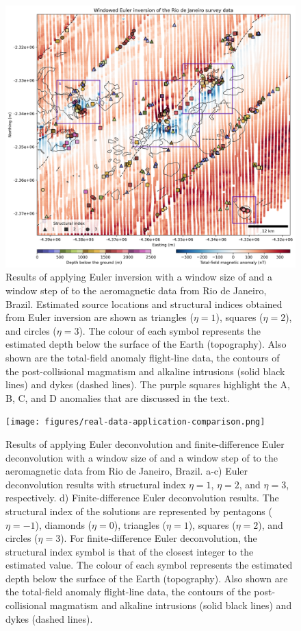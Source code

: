 \begin{figure}[tb!]
\centering
\includegraphics[width=1\linewidth]{figures/real-data-application.png}
\caption{
    Results of applying Euler inversion with a window size of \RioWindowSize{}
    and a window step of \RioWindowStep{} to the aeromagnetic data from Rio de
    Janeiro, Brazil.
    Estimated source locations and structural indices obtained from Euler
    inversion are shown as triangles ($\eta=1$), squares ($\eta=2$), and
    circles ($\eta=3$).
    The colour of each symbol represents the estimated depth below the surface
    of the Earth (topography).
    Also shown are the total-field anomaly flight-line data, the contours of
    the post-collisional magmatism and alkaline intrusions (solid black lines)
    and dykes (dashed lines).
    The purple squares highlight the A, B, C, and D anomalies that are
    discussed in the text.
}
\label{fig:rio_results}
\end{figure}

\begin{figure}[tb!]
\centering
\texttt{[image: figures/real-data-application-comparison.png]}
\caption{
    Results of applying Euler deconvolution and finite-difference Euler
    deconvolution with a window size of \RioWindowSize{} and a window step of
    \RioWindowStep{} to the aeromagnetic data from Rio de Janeiro, Brazil.
    a-c) Euler deconvolution results with structural index $\eta=1$, $\eta=2$,
    and $\eta=3$, respectively.
    d) Finite-difference Euler deconvolution results.
    The structural index of the solutions are represented by pentagons
    ($\eta=-1$),  diamonds ($\eta=0$),  triangles ($\eta=1$),  squares
    ($\eta=2$), and circles ($\eta=3$).
    For finite-difference Euler deconvolution, the structural index symbol is
    that of the closest integer to the estimated value.
    The colour of each symbol represents the estimated depth below the surface
    of the Earth (topography).
    Also shown are the total-field anomaly flight-line data, the contours of
    the post-collisional magmatism and alkaline intrusions (solid black lines)
    and dykes (dashed lines).
}
\label{fig:rio_comp}
\end{figure}

